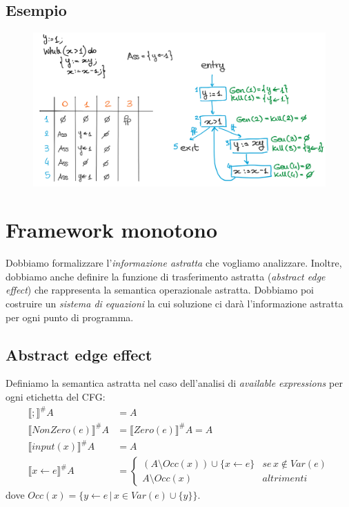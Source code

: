\documentclass[a4paper,oneside,titlepage]{book}
\begin{document}
\subsection{Esempio}
\label{avail4}
\begin{figure}[htp]
	\centering
	\includegraphics[width=\textwidth, height=\textheight, keepaspectratio]{availExp5.png}
\end{figure}


\section{Framework monotono} %
Dobbiamo formalizzare l'\textit{informazione astratta} che vogliamo analizzare. Inoltre, dobbiamo anche definire la funzione di trasferimento astratta (\textit{abstract edge effect}) che rappresenta la semantica operazionale astratta. Dobbiamo poi costruire un \textit{sistema di equazioni} la cui soluzione ci darà l'informazione astratta per ogni punto di programma.

\subsection{Abstract edge effect}
\label{avail3}
Definiamo la semantica astratta nel caso dell'analisi di \textit{available expressions} per ogni etichetta del CFG:
\begin{align*}
    \llbracket ; \rrbracket^\# A &= A \\
    \llbracket NonZero(e) \rrbracket^\# A &= \llbracket Zero(e) \rrbracket^\# A = A \\
    \llbracket input(x) \rrbracket^\# A &= A \\
    \llbracket x \leftarrow e \rrbracket^\# A &=
        \begin{cases}
    		(A \setminus Occ(x)) \cup \{ x \leftarrow e \} & se \, x \notin Var(e) \\
    		A \setminus Occ(x) & altrimenti
    	\end{cases}
\end{align*}
dove $Occ(x) = \{ y \leftarrow e \, | \, x \in Var(e) \cup \{ y \} \}$.
\end{document}
